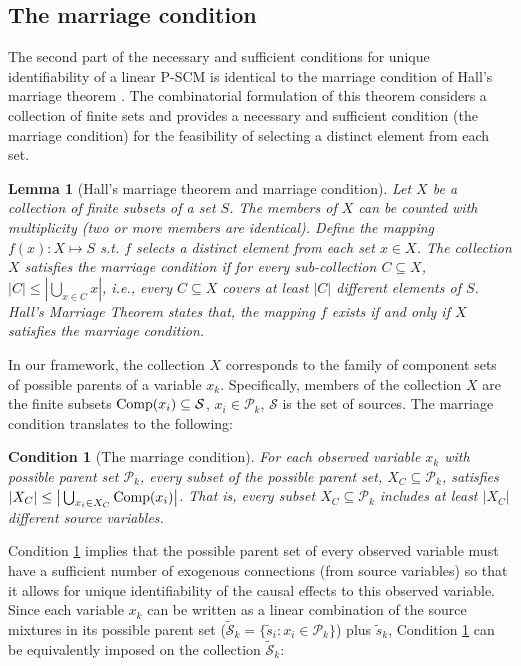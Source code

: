 \documentclass[12pt]{article}
\newtheorem{lemma}{Lemma}
\newtheorem{condition}{Condition}
\newcommand{\setS}{\mathcal{S}}
\begin{document}
\subsection{The marriage condition} \label{sec:marriage_condition} 
\vspace{-1mm}
The second part of the necessary and sufficient conditions for unique identifiability of a linear P-SCM is identical to the marriage condition of Hall's marriage theorem \citep{cameron1994combinatorics}. The combinatorial formulation of this theorem considers a collection of finite sets and provides a necessary and sufficient condition (the marriage condition) for the feasibility of selecting a distinct element from each set.  
\begin{lemma}[Hall's marriage theorem and marriage condition] \label{Lemma : Marriage Theorem}
Let $X$ be a collection of finite subsets of a set $S$. The members of $X$ can be counted with multiplicity (two or more members are identical). Define the mapping $f(x): X\mapsto S$ s.t. $f$ selects a distinct element from each set $x\in X$. The collection $X$ satisfies the marriage condition if for every sub-collection $C \subseteq X$,
$|C| \leq |\bigcup_{x\in C}  x |$, i.e., every $C \subseteq X$ covers at least $|C|$ different elements of $S$. Hall's Marriage Theorem states that, the mapping $f$ exists if and only if $X$ satisfies the marriage condition.
\end{lemma}
In our framework, the collection $X$ corresponds to the family of component sets of possible parents of a variable $x_k$. Specifically, members of the collection $X$ are the finite subsets ${\rm{Comp}}(x_i)\subseteq \setS$,  $x_i\in\mathcal{P}_k$, $\setS$ is the set of sources. 
The marriage condition translates to the following:
\begin{condition}[The marriage condition] \label{condition:marriage}
For each observed variable $x_k$ with possible parent set $\mathcal{P}_k$, every subset of the possible parent set, $X_C \subseteq \mathcal{P}_k$, satisfies $|X_C| \leq \big| \bigcup_{x_i\in X_C} {\rm{Comp}}(x_i) \big|$. That is, every subset $X_C\subseteq \mathcal{P}_k$ includes at least $|X_C|$ different source variables. 
\end{condition}
{Condition \ref{condition:marriage} implies that the possible parent set of every observed variable must have a sufficient number of exogenous connections (from source variables) so that it allows for unique identifiability of the causal effects to this observed variable.} Since each variable $x_k$ can be written as a linear combination of the source mixtures in its possible parent set ($\tilde{\setS}_k=\{\tilde{s}_i: x_i\in \mathcal{P}_k\}$) plus $\tilde{s}_k$, Condition \ref{condition:marriage} can be equivalently imposed on the collection $\tilde{\setS}_k$:
\end{document}
